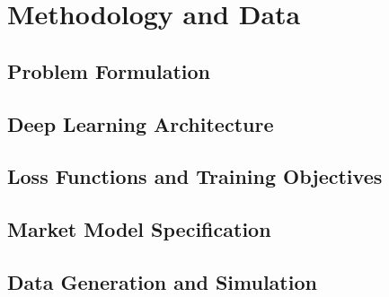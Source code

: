 
\section{Methodology and Data}
\label{sec:methodology}


\subsection{Problem Formulation}
\label{subsec:methodology_problem}


\subsection{Deep Learning Architecture}
\label{subsec:architectures}


\subsection{Loss Functions and Training Objectives}
\label{subsec:loss_functions}


\subsection{Market Model Specification}
\label{subsec:market_specification}


\subsection{Data Generation and Simulation}
\label{subsec:data_generation}

